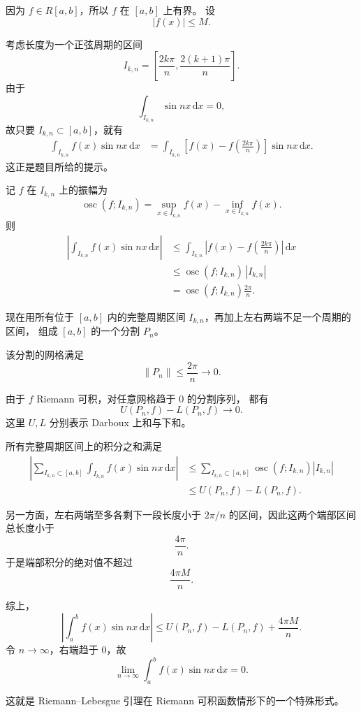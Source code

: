 \documentclass[12pt,a4paper]{ctexart}
\newcommand{\dd}{\,\mathrm d}
\begin{document}
因为 \(f\in R[a,b]\)，所以 \(f\) 在 \([a,b]\) 上有界。
设
\[
|f(x)|\le M.
\]

考虑长度为一个正弦周期的区间
\[
I_{k,n}
=
\left[
\frac{2k\pi}{n},
\frac{2(k+1)\pi}{n}
\right].
\]
由于
\[
\int_{I_{k,n}}\sin nx\dd x=0,
\]
故只要 \(I_{k,n}\subset[a,b]\)，就有
\begin{align*}
\int_{I_{k,n}}f(x)\sin nx\dd x
&=
\int_{I_{k,n}}
\left[
f(x)-f\left(\frac{2k\pi}{n}\right)
\right]
\sin nx\dd x.
\end{align*}
这正是题目所给的提示。

记 \(f\) 在 \(I_{k,n}\) 上的振幅为
\[
\operatorname{osc}(f;I_{k,n})
=
\sup_{x\in I_{k,n}}f(x)
-
\inf_{x\in I_{k,n}}f(x).
\]
则
\begin{align*}
\left|
\int_{I_{k,n}}f(x)\sin nx\dd x
\right|
&\le
\int_{I_{k,n}}
\left|
f(x)-f\left(\frac{2k\pi}{n}\right)
\right|\dd x\\
&\le
\operatorname{osc}(f;I_{k,n})
\,|I_{k,n}|\\
&=
\operatorname{osc}(f;I_{k,n})
\frac{2\pi}{n}.
\end{align*}

现在用所有位于 \([a,b]\) 内的完整周期区间
\(I_{k,n}\)，再加上左右两端不足一个周期的区间，
组成 \([a,b]\) 的一个分割 \(P_n\)。

该分割的网格满足
\[
\|P_n\|
\le
\frac{2\pi}{n}
\longrightarrow0.
\]

由于 \(f\) Riemann 可积，对任意网格趋于 \(0\) 的分割序列，
都有
\[
U(P_n,f)-L(P_n,f)\longrightarrow0.
\]
这里 \(U,L\) 分别表示 Darboux 上和与下和。

所有完整周期区间上的积分之和满足
\begin{align*}
\left|
\sum_{I_{k,n}\subset[a,b]}
\int_{I_{k,n}}
f(x)\sin nx\dd x
\right|
&\le
\sum_{I_{k,n}\subset[a,b]}
\operatorname{osc}(f;I_{k,n})|I_{k,n}|\\
&\le
U(P_n,f)-L(P_n,f).
\end{align*}

另一方面，左右两端至多各剩下一段长度小于
\(2\pi/n\) 的区间，因此这两个端部区间总长度小于
\[
\frac{4\pi}{n}.
\]
于是端部积分的绝对值不超过
\[
\frac{4\pi M}{n}.
\]

综上，
\[
\left|
\int_a^bf(x)\sin nx\dd x
\right|
\le
U(P_n,f)-L(P_n,f)
+
\frac{4\pi M}{n}.
\]
令 \(n\to\infty\)，右端趋于 \(0\)，故
\[
\boxed{
\lim_{n\to\infty}
\int_a^bf(x)\sin nx\dd x
=
0.
}
\]

这就是 Riemann--Lebesgue 引理在 Riemann 可积函数情形下的一个特殊形式。
\end{document}

